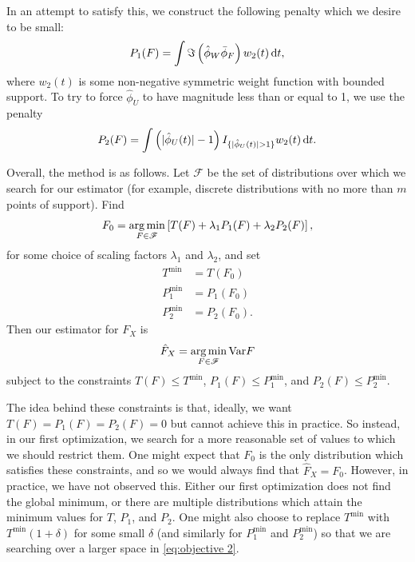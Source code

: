 	In an attempt to satisfy this, we construct the following penalty which we desire to be small:
	\begin{align}
		P_1(F) = \int \Im \left(\hat{\phi}_W \bar{\phi}_F\right) w_2(t)\, \mathrm{d} t,
		\label{eq:penalty1}
	\end{align}
	where $w_2(t)$ is some non-negative symmetric weight function with bounded support.	To try to force $\hat{\phi}_U$ to have magnitude less than or equal to 1, we use the penalty
	\begin{align}
		P_2(F) = \int \left(|\hat{\phi}_U(t)| - 1\right) I_{\{|\hat{\phi}_U(t)| > 1\}}  w_2(t) \, \mathrm{d} t.
		\label{eq:penalty2}
	\end{align} 

	Overall, the method is as follows. Let $\mathscr{F}$ be the set of distributions over which we search for our estimator (for example, discrete distributions with no more than $m$ points of support). Find
	\begin{equation}
		F_0 = \operatorname*{arg\,min}_{F \in \mathscr{F}} \left[T(F) + \lambda_1 P_1(F) + \lambda_2 P_2(F)\right],
		\label{eq:objective 1}
	\end{equation}
	for some choice of scaling factors $\lambda_1$ and $\lambda_2$, and set
	\begin{align}
		T^\mathrm{min} &= T(F_0)\\
		P_1^\mathrm{min} &= P_1(F_0)\\
		P_2^\mathrm{min} &= P_2(F_0).
	\end{align}
	Then our estimator for $F_X$ is
	\begin{equation}
		\hat{F}_X = \operatorname*{arg\,min}_{F \in \mathscr{F}} \mathrm{Var}{F}
		\label{eq:objective 2}
	\end{equation}
	subject to the constraints $T(F) \leq T^\mathrm{min}$, $P_1(F) \leq P_1^\mathrm{min}$, and $P_2(F) \leq P_2^\mathrm{min}$.

	The idea behind these constraints is that, ideally, we want $T(F) = P_1(F) = P_2(F) = 0$ but cannot achieve this in practice. So instead, in our first optimization, we search for a more reasonable set of values to which we should restrict them. One might expect that $F_0$ is the only distribution which satisfies these constraints, and so we would always find that $\hat{F}_X = F_0$. However, in practice, we have not observed this. Either our first optimization does not find the global minimum, or there are multiple distributions which attain the minimum values for $T$, $P_1$, and $P_2$. One might also choose to replace $T^\mathrm{min}$ with $T^\mathrm{min}(1 + \delta)$ for some small $\delta$ (and similarly for $P_1^\mathrm{min}$ and $P_2^\mathrm{min}$) so that we are searching over a larger space in \eqref{eq:objective 2}.
	
